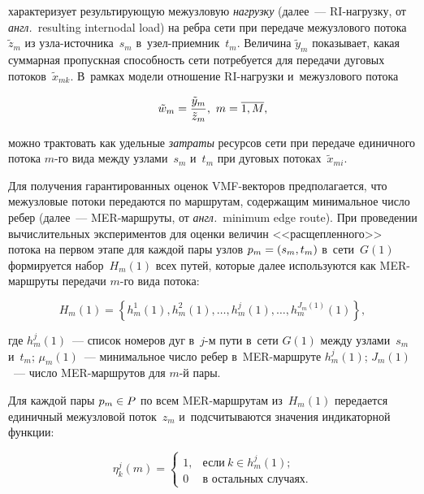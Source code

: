 \begin{multicols}{2}
\noindent
характеризует результирующую межузловую \textit{нагрузку} (далее~--- RI-на\-груз\-ку, 
от \textit{англ.}\ resulting internodal load) на ребра сети  при передаче  межузлового 
потока~$\tilde{z}_m$ из уз\-ла-ис\-точ\-ни\-ка~$s_m$  в~узел-при\-ем\-ник~$t_m$. Величина 
$\tilde{y}_m$ показывает, какая суммарная пропускная способность сети 
потребуется для передачи дуговых потоков~$\tilde{x}_{mk}$. В~рамках модели 
отношение RI-на\-груз\-ки и~межузлового потока

\vspace*{2pt}

\noindent
$$
 \tilde{w}_m = \displaystyle\frac{\displaystyle \tilde{y}_m\mathstrut}{\displaystyle \tilde{z}_m\mathstrut},  \ m = \overline{1, M},
 $$

 \vspace*{-2pt}

\noindent
можно трактовать как удельные \textit{затраты}  ресурсов сети при передаче 
единичного   потока $m$-го вида между узлами~$s_m$ и~$t_m$ при  дуговых потоках~$\tilde{x}_{mi}$.

Для получения гарантированных оценок VMF-век\-то\-ров предполагается, что межузловые 
потоки передаются по маршрутам, содержащим минимальное число ребер (далее~--- 
MER-марш\-ру\-ты, от \textit{англ.}\ mi\-ni\-mum edge route).
При проведении вычислительных экспериментов для оценки величин <<расщепленного>> 
потока на первом этапе для каждой пары узлов $p_m\hm = (s_m, t_m)$ в~сети~$G(1)$ 
формируется набор~$H_m(1)$ всех  путей, которые далее используются как MER-марш\-ру\-ты передачи $m$-го вида потока:

\vspace*{2pt}

\noindent
$$
H_m(1) = \left\{ h_m^1(1), h_m^2(1), \ldots, h_m^j(1), \ldots, h_m^{J_m(1)}(1)\right\},
$$

\vspace*{-2pt}

\noindent
где $h_m^j(1)$~--- список номеров дуг в~$j$-м  пути в~сети $G(1)$ между узлами~$s_m$ и~$t_m$;  $\mu_m(1)$~--- минимальное число ребер в~MER-марш\-ру\-те 
$h_m^j(1)$; $J_m(1)$~--- число MER-марш\-ру\-тов для $m$-й пары.

Для каждой пары $p_m \hm\in P$ по всем MER-марш\-ру\-там из~$H_m(1)$ передается 
единичный межузловой поток~$z_m$ и~подсчитываются значения индикаторной функции:

\noindent
$$ 
\eta_k^j(m) = \begin{cases}
 1, & \mbox{если}\ k \in h_m^j(1); \\
 0 & \mbox{в\ остальных\ случаях.}
\end{cases}
 $$
 

\end{multicols}
